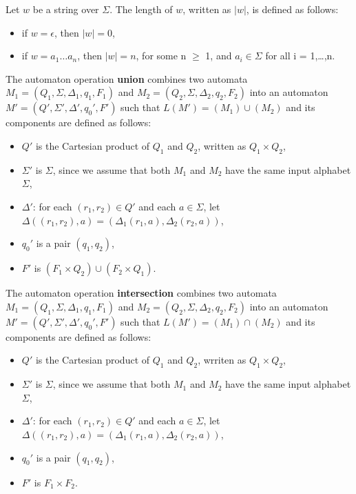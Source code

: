 \begin{mydef}
Let $w$ be a string over $\Sigma$.
The length of $w$, written as $|w|$, is defined as follows:
\begin{itemize}
  \item if $w = \epsilon$, then $|w| = 0$,
  \item if $w = a_{1} \dots a_{n}$, then $|w| = n$, for some n $\geq$ 1, and $a_{i} \in \Sigma$ for all i = 1,\dots,n.
\end{itemize}
\end{mydef}


\begin{mydef}
The automaton operation \textbf{union} combines two automata $M_1 = (Q_1, \Sigma, \Delta_1, q_{1}, F_1)$ and $M_2 = (Q_2, \Sigma, \Delta_2, q_{2}, F_2)$ into an automaton $M' = (Q', \Sigma', \Delta', q_{0}', F')$ such that $L(M') = (M_1) \cup (M_2)$ and its components are defined as follows:
\begin{itemize}
  \item $Q'$ is the Cartesian product of $Q_1$ and $Q_2$, written as $Q_1 \times Q_2$,
  \item $\Sigma'$ is $\Sigma$, since we assume that both $M_1$ and $M_2$ have the same input alphabet $\Sigma$,
  \item $\Delta'$: for each $(r_{1}, r_{2}) \in Q'$ and each $a \in \Sigma$, let $\Delta((r_{1}, r_{2}), a) = (\Delta_1(r_{1}, a), \Delta_2(r_{2}, a))$,
  \item $q_{0}'$ is a pair $(q_{1}, q_{2})$,
  \item $F'$ is $(F_1 \times Q_2) \cup (F_2 \times Q_1)$.
\end{itemize}

\end{mydef}

\begin{mydef}
The automaton operation \textbf{intersection} combines two automata $M_1 = (Q_1, \Sigma, \Delta_1, q_{1}, F_1)$ and $M_2 = (Q_2, \Sigma, \Delta_2, q_{2}, F_2)$ into an automaton $M' = (Q', \Sigma', \Delta', q_{0}', F')$ such that $L(M') = (M_1) \cap (M_2)$ and its components are defined as follows:
\begin{itemize}
  \item $Q'$ is the Cartesian product of $Q_1$ and $Q_2$, wrriten as $Q_1 \times Q_2$,
  \item $\Sigma'$ is $\Sigma$, since we assume that both $M_1$ and $M_2$ have the same input alphabet $\Sigma$,
  \item $\Delta'$: for each $(r_{1}, r_{2}) \in Q'$ and each $a \in \Sigma$, let $\Delta((r_{1}, r_{2}), a) = (\Delta_1(r_{1}, a), \Delta_2(r_{2}, a))$,
  \item $q_{0}'$ is a pair $(q_{1}, q_{2})$,
  \item $F'$ is $F_1 \times F_2$.
\end{itemize}

\end{mydef}

